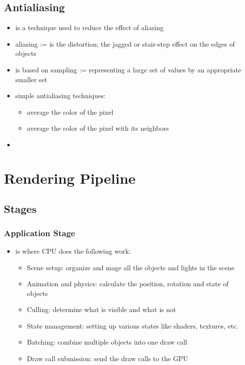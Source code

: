         \subsection{Antialiasing}
            \begin{itemize}
                \item is a technique used to reduce the effect of aliasing
                \item aliasing := is the distortion; the jagged or stair-step effect on the edges of objects
                \item is based on sampling := representing a large set of values by an appropriate smaller set
                \item simple antialiasing techniques: 
                \begin{itemize}
                    \item average the color of the pixel
                    \item average the color of the pixel with its neighbors
                \end{itemize}
                \item 
            \end{itemize}
        
        \section{Rendering Pipeline}
        


        \subsection{Stages}
            \subsubsection{Application Stage}
                \begin{itemize}
                    \item is where CPU does the following work:
                    \begin{itemize}
                        \item Scene setup: organize and mage all the objects and lights in the scene
                        \item Animation and physics: calculate the position, rotation and state of objects
                        \item Culling: determine what is visible and what is not
                        \item State management: setting up various states like shaders, textures, etc.
                        \item Batching: combine multiple objects into one draw call
                        \item Draw call submission: send the draw calls to the GPU
                    \end{itemize}
                \end{itemize}

